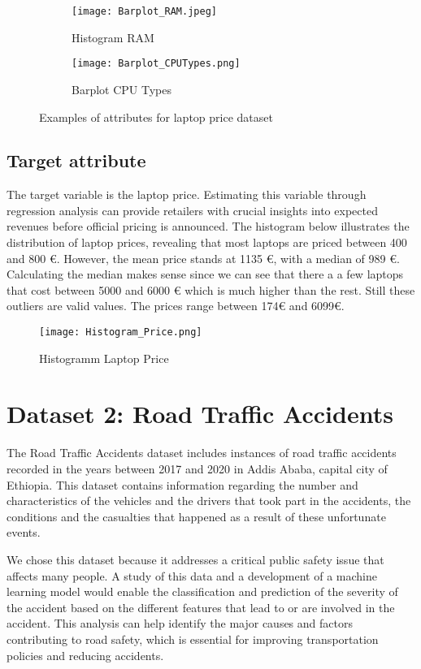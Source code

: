 \documentclass{article}
\begin{document}
 \begin{figure}[H]
    \centering 
    \begin{subfigure}[b]{0.35\textwidth}
        \centering
        \texttt{[image: Barplot\_RAM.jpeg]} 
        \caption{Histogram RAM}
        \label{fig:figure1}
    \end{subfigure}
     \hspace{0.05\textwidth} %
    \begin{subfigure}[b]{0.35\textwidth}
        \centering
        \texttt{[image: Barplot\_CPUTypes.png]} 
        \caption{Barplot CPU Types}
        \label{fig:figure2}
    \end{subfigure}
    \caption{Examples of attributes for laptop price dataset}
    \label{fig:two_figures}
\end{figure}

\subsection{Target attribute}
The target variable is the laptop price. Estimating this variable through regression analysis can provide retailers with crucial insights into expected revenues before official pricing is announced. The histogram below illustrates the distribution of laptop prices, revealing that most laptops are priced between 400 and 800 €. However, the mean price stands at 1135 €, with a median of 989 €. Calculating the median makes sense since we can see that there a a few laptops that cost between 5000 and 6000 € which is much higher than the rest. Still these outliers are valid values. The prices range between 174€ and 6099€.

\begin{figure}[H]
\centering
\texttt{[image: Histogram\_Price.png]}
\caption{\label{fig:hist:price}Histogramm Laptop Price}
\end{figure}

\section{Dataset 2: Road Traffic Accidents}

The Road Traffic Accidents dataset includes instances of road traffic accidents recorded in the years between 2017 and 2020 in Addis Ababa, capital city of Ethiopia. This dataset contains information regarding the number and characteristics of the vehicles and the drivers that took part in the accidents, the conditions and the casualties that happened as a result of these unfortunate events.
\par We chose this dataset because it addresses a critical public safety issue that affects many people. A study of this data and a development of a machine learning model would enable the classification and prediction of the severity of the accident based on the different features that lead to or are involved in the accident. This analysis can help identify the major causes and factors contributing to road safety, which is essential for improving transportation policies and reducing accidents. 
\end{document}
